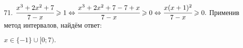 71. $\cfrac{x^3+2x^2+7}{7-x}\geqslant1\Leftrightarrow\cfrac{x^3+2x^2+7-7+x}{7-x}\geqslant0\Leftrightarrow
\cfrac{x(x+1)^2}{7-x}\geqslant0.$ Применив метод интервалов, найдём ответ:
\begin{figure}[ht!]
\end{figure}
$x\in\{-1\}\cup[0;7).$\\
